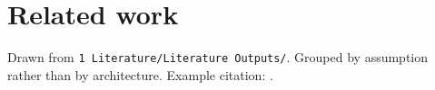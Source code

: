 \section{Related work}
\label{sec:related}

Drawn from \texttt{1 Literature/Literature Outputs/}. Grouped by assumption rather than
by architecture. Example citation: \citet{example2026placeholder}.
